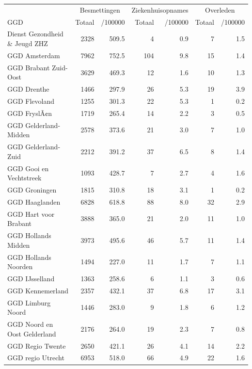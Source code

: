 \documentclass[
  english,
  man,floatsintext]{apa6}
\begin{document}
\begin{table}[H]
\centering\begingroup\fontsize{10}{12}\selectfont

\begin{threeparttable}
\begin{tabular}{lrrrrrr}
\toprule
\multicolumn{1}{c}{ } & \multicolumn{2}{c}{Besmettingen} & \multicolumn{2}{c}{Ziekenhuisopnames} & \multicolumn{2}{c}{Overleden} \\
\cmidrule(l{3pt}r{3pt}){2-3} \cmidrule(l{3pt}r{3pt}){4-5} \cmidrule(l{3pt}r{3pt}){6-7}
GGD & Totaal & /100000 & Totaal & /100000 & Totaal & /100000\\
\midrule
Dienst Gezondheid \& Jeugd ZHZ & 2328 & 509.5 & 4 & 0.9 & 7 & 1.5\\
GGD Amsterdam & 7962 & 752.5 & 104 & 9.8 & 15 & 1.4\\
GGD Brabant Zuid-Oost & 3629 & 469.3 & 12 & 1.6 & 10 & 1.3\\
GGD Drenthe & 1466 & 297.9 & 26 & 5.3 & 19 & 3.9\\
GGD Flevoland & 1255 & 301.3 & 22 & 5.3 & 1 & 0.2\\
GGD FryslÃ¢n & 1719 & 265.4 & 14 & 2.2 & 3 & 0.5\\
GGD Gelderland-Midden & 2578 & 373.6 & 21 & 3.0 & 7 & 1.0\\
GGD Gelderland-Zuid & 2212 & 391.2 & 37 & 6.5 & 8 & 1.4\\
GGD Gooi en Vechtstreek & 1093 & 428.7 & 7 & 2.7 & 4 & 1.6\\
GGD Groningen & 1815 & 310.8 & 18 & 3.1 & 1 & 0.2\\
GGD Haaglanden & 6828 & 618.8 & 88 & 8.0 & 32 & 2.9\\
GGD Hart voor Brabant & 3888 & 365.0 & 21 & 2.0 & 11 & 1.0\\
GGD Hollands Midden & 3973 & 495.6 & 46 & 5.7 & 11 & 1.4\\
GGD Hollands Noorden & 1494 & 227.0 & 11 & 1.7 & 7 & 1.1\\
GGD IJsselland & 1363 & 258.6 & 6 & 1.1 & 3 & 0.6\\
GGD Kennemerland & 2357 & 432.1 & 37 & 6.8 & 17 & 3.1\\
GGD Limburg Noord & 1446 & 283.0 & 9 & 1.8 & 6 & 1.2\\
GGD Noord en Oost Gelderland & 2176 & 264.0 & 19 & 2.3 & 7 & 0.8\\
GGD Regio Twente & 2650 & 421.1 & 26 & 4.1 & 14 & 2.2\\
GGD regio Utrecht & 6953 & 518.0 & 66 & 4.9 & 22 & 1.6\\

\end{tabular}
\end{threeparttable}
\end{table}
\end{document}
